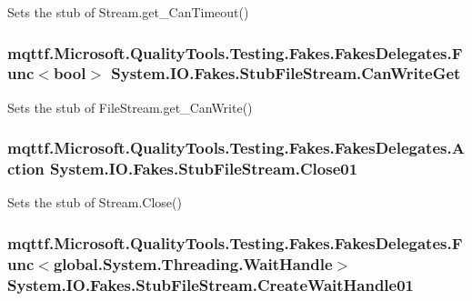 Sets the stub of Stream.\-get\-\_\-\-Can\-Timeout()

\hypertarget{class_system_1_1_i_o_1_1_fakes_1_1_stub_file_stream_aad22ce903be8f603ff454d65f5b36068}{
\subsubsection[{Can\-Write\-Get}]{\setlength{\rightskip}{0pt plus 5cm}mqttf.\-Microsoft.\-Quality\-Tools.\-Testing.\-Fakes.\-Fakes\-Delegates.\-Func$<$bool$>$ System.\-I\-O.\-Fakes.\-Stub\-File\-Stream.\-Can\-Write\-Get}}\label{class_system_1_1_i_o_1_1_fakes_1_1_stub_file_stream_aad22ce903be8f603ff454d65f5b36068}


Sets the stub of File\-Stream.\-get\-\_\-\-Can\-Write()

\hypertarget{class_system_1_1_i_o_1_1_fakes_1_1_stub_file_stream_a7925905bfe3f2617be5d62fc9e1d3ed7}{
\subsubsection[{Close01}]{\setlength{\rightskip}{0pt plus 5cm}mqttf.\-Microsoft.\-Quality\-Tools.\-Testing.\-Fakes.\-Fakes\-Delegates.\-Action System.\-I\-O.\-Fakes.\-Stub\-File\-Stream.\-Close01}}\label{class_system_1_1_i_o_1_1_fakes_1_1_stub_file_stream_a7925905bfe3f2617be5d62fc9e1d3ed7}


Sets the stub of Stream.\-Close()

\hypertarget{class_system_1_1_i_o_1_1_fakes_1_1_stub_file_stream_a0dc9fa2814677c9e0f91474d6a300327}{
\subsubsection[{Create\-Wait\-Handle01}]{\setlength{\rightskip}{0pt plus 5cm}mqttf.\-Microsoft.\-Quality\-Tools.\-Testing.\-Fakes.\-Fakes\-Delegates.\-Func$<$global.\-System.\-Threading.\-Wait\-Handle$>$ System.\-I\-O.\-Fakes.\-Stub\-File\-Stream.\-Create\-Wait\-Handle01}}\label{class_system_1_1_i_o_1_1_fakes_1_1_stub_file_stream_a0dc9fa2814677c9e0f91474d6a300327}


